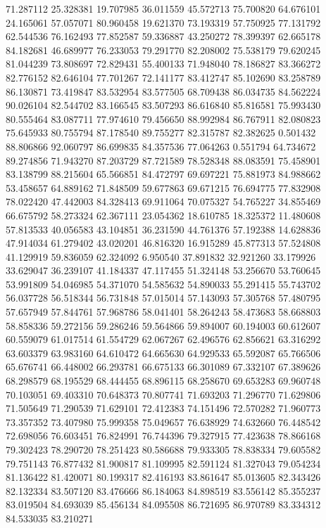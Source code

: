 71.287112
25.328381
19.707985
36.011559
45.572713
75.700820
64.676101
24.165061
57.057071
80.960458
19.621370
73.193319
57.750925
77.131792
62.544536
76.162493
77.852587
59.336887
43.250272
78.399397
62.665178
84.182681
46.689977
76.233053
79.291770
82.208002
75.538179
79.620245
81.044239
73.808697
72.829431
55.400133
71.948040
78.186827
83.366272
82.776152
82.646104
77.701267
72.141177
83.412747
85.102690
83.258789
86.130871
73.419847
83.532954
83.577505
68.709438
86.034735
84.562224
90.026104
82.544702
83.166545
83.507293
86.616840
85.816581
75.993430
80.555464
83.087711
77.974610
79.456650
88.992984
86.767911
82.080823
75.645933
80.755794
87.178540
89.755277
82.315787
82.382625
0.501432
88.806866
92.060797
86.699835
84.357536
77.064263
0.551794
64.734672
89.274856
71.943270
87.203729
87.721589
78.528348
88.083591
75.458901
83.138799
88.215604
65.566851
84.472797
69.697221
75.881973
84.988662
53.458657
64.889162
71.848509
59.677863
69.671215
76.694775
77.832908
78.022420
47.442003
84.328413
69.911064
70.075327
54.765227
34.855469
66.675792
58.273324
62.367111
23.054362
18.610785
18.325372
11.480608
57.813533
40.056583
43.104851
36.231590
44.761376
57.192388
14.628836
47.914034
61.279402
43.020201
46.816320
16.915289
45.877313
57.524808
41.129919
59.836059
62.324092
6.950540
37.891832
32.921260
33.179926
33.629047
36.239107
41.184337
47.117455
51.324148
53.256670
53.760645
53.991809
54.046985
54.371070
54.585632
54.890033
55.291415
55.743702
56.037728
56.518344
56.731848
57.015014
57.143093
57.305768
57.480795
57.657949
57.844761
57.968786
58.041401
58.264243
58.473683
58.668803
58.858336
59.272156
59.286246
59.564866
59.894007
60.194003
60.612607
60.559079
61.017514
61.554729
62.067267
62.496576
62.856621
63.316292
63.603379
63.983160
64.610472
64.665630
64.929533
65.592087
65.766506
65.676741
66.448002
66.293781
66.675133
66.301089
67.332107
67.389626
68.298579
68.195529
68.444455
68.896115
68.258670
69.653283
69.960748
70.103051
69.403310
70.648373
70.807741
71.693203
71.296770
71.629806
71.505649
71.290539
71.629101
72.412383
74.151496
72.570282
71.960773
73.357352
73.407980
75.999358
75.049657
76.638929
74.632660
76.448542
72.698056
76.603451
76.824991
76.744396
79.327915
77.423638
78.866168
79.302423
78.290720
78.251423
80.586688
79.933305
78.838334
79.605582
79.751143
76.877432
81.900817
81.109995
82.591124
81.327043
79.054234
81.136422
81.420071
80.199317
82.416193
83.861647
85.013605
82.343426
82.132334
83.507120
83.476666
86.184063
84.898519
83.556142
85.355237
83.019504
84.693039
85.456134
84.095508
86.721695
86.970789
83.334312
84.533035
83.210271
